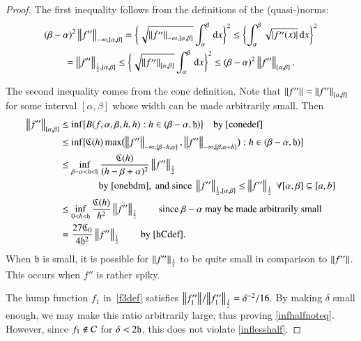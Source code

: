 \documentclass[review]{elsarticle}
\theoremstyle{definition}
\begin{document}
\begin{proof}
The first inequality follows from the definitions of the (quasi-)norms:
\begin{multline} \label{onebdm}
 (\beta - \alpha)^2 \norm[-\infty,{[\alpha,\beta]}]{f''}
 = \biggl\{\sqrt{\norm[-\infty,{[\alpha,\beta]}]{f''}}  \int_{\alpha}^{\beta} \, \dif x \biggr\}^2
 \le \biggl\{ \int_{\alpha}^{\beta} \sqrt{\abs{f''(x)}} \, \dif x \biggr\}^2\\
 = \norm[\frac 12,{[\alpha,\beta]}]{f''}
 \le\biggl\{\sqrt{\norm[{[\alpha,\beta]}]{f''}}  \int_{\alpha}^{\beta} \, \dif x \biggr\}^2
 \le  (\beta - \alpha)^2 \norm[{[\alpha,\beta]}]{f''}.
\end{multline}

The second inequality comes from the cone definition.  Note that
$\norm{f''}  = \norm[{[\alpha,\beta]}]{f''}$  for some interval $[\alpha,\beta]$ whose
width can be made arbitrarily small.  Then
\begin{align*}
\norm[{[\alpha,\beta]}]{f''}
& \le \inf\bigl\{B(f,\alpha,\beta,h,h) : h \in (\beta - \alpha,\fh) \bigr \} \quad \text{by}~\eqref{conedef} \\
& \le  \inf\bigl\{\fC(h) \max\bigl(\norm[-\infty,{[\beta - h, \alpha]}]{f''},
\norm[-\infty,{[\beta, \alpha+h]}]{f''}\bigr) : h \in (\beta - \alpha,\fh) \bigr \} \\
& \le \inf_{\beta - \alpha < h < \fh} \frac{\fC(h)}{(h-\beta+\alpha)^2}\norm[\frac 12]{f''} \\
& \qquad \qquad\text{by}~\eqref{onebdm}, \text{ and since }
\norm[{\frac12,[\alpha,\beta]}]{f''} \le \norm[\frac 12]{f''} \ \forall [\alpha,\beta]
\subseteq [a,b] \\
& \le \inf_{0 < h < \fh} \frac{\fC(h)}{h^2}\norm[\frac 12]{f''} \qquad
\text{since $\beta-\alpha$ may be made arbitrarily small}\\
& = \frac{27\fC_0}{4\fh^2}\norm[\frac 12]{f''} \qquad \text{by \eqref{hCdef}}.
\end{align*}
When $\fh$ is small, it is possible for $\norm[\frac 12]{f''} $ to be quite
small in comparison to $\norm{f''}$. This occurs when $f''$ is rather spiky.

The hump function $f_1$ in~\eqref{f3def}  satisfies
$
 {\norm{f_1''}}/{\norm[\frac 12]{f_1''}}  =  { \delta^{-2}}/{16}.
$
By making $\delta$ small enough, we may make this ratio arbitrarily large, thus proving
\eqref{infhalfnoteq}. However, since $f_1
\notin \cc$ for $\delta < 2\fh$, this does not violate \eqref{inflesshalf}.
\end{proof}
\end{document}
